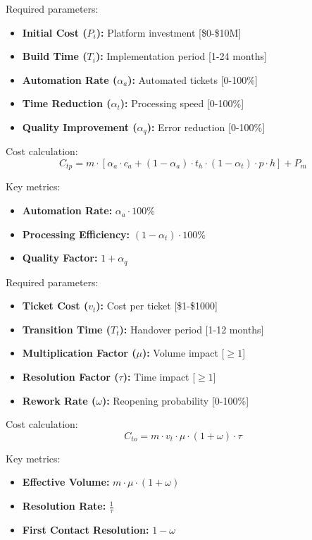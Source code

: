 \documentclass[12pt,a4paper]{article}
\newenvironment{definition}[1]
{\begin{mdframed}[style=definitionstyle,frametitle={Definition: #1}]}
{\end{mdframed}}
\begin{document}
\begin{definition}{Ticket Platform Solution Inputs}
Required parameters:
\begin{itemize}
    \item \textbf{Initial Cost ($P_i$):} Platform investment [\$0-\$10M]
    \item \textbf{Build Time ($T_i$):} Implementation period [1-24 months]
    \item \textbf{Automation Rate ($\alpha_a$):} Automated tickets [0-100\%]
    \item \textbf{Time Reduction ($\alpha_t$):} Processing speed [0-100\%]
    \item \textbf{Quality Improvement ($\alpha_q$):} Error reduction [0-100\%]
\end{itemize}

Cost calculation:
\begin{equation}
    C_{tp} = m \cdot [\alpha_a \cdot c_a + (1-\alpha_a) \cdot t_h \cdot (1-\alpha_t) \cdot p \cdot h] + P_m
\end{equation}

Key metrics:
\begin{itemize}
    \item \textbf{Automation Rate:} $\alpha_a \cdot 100\%$
    \item \textbf{Processing Efficiency:} $(1 - \alpha_t) \cdot 100\%$
    \item \textbf{Quality Factor:} $1 + \alpha_q$
\end{itemize}
\end{definition}

\begin{definition}{Ticket Outsourcing Solution Inputs}
Required parameters:
\begin{itemize}
    \item \textbf{Ticket Cost ($v_t$):} Cost per ticket [\$1-\$1000]
    \item \textbf{Transition Time ($T_t$):} Handover period [1-12 months]
    \item \textbf{Multiplication Factor ($\mu$):} Volume impact [$\geq 1$]
    \item \textbf{Resolution Factor ($\tau$):} Time impact [$\geq 1$]
    \item \textbf{Rework Rate ($\omega$):} Reopening probability [0-100\%]
\end{itemize}

Cost calculation:
\begin{equation}
    C_{to} = m \cdot v_t \cdot \mu \cdot (1 + \omega) \cdot \tau
\end{equation}

Key metrics:
\begin{itemize}
    \item \textbf{Effective Volume:} $m \cdot \mu \cdot (1 + \omega)$
    \item \textbf{Resolution Rate:} $\frac{1}{\tau}$
    \item \textbf{First Contact Resolution:} $1 - \omega$
\end{itemize}
\end{definition}
\end{document}
